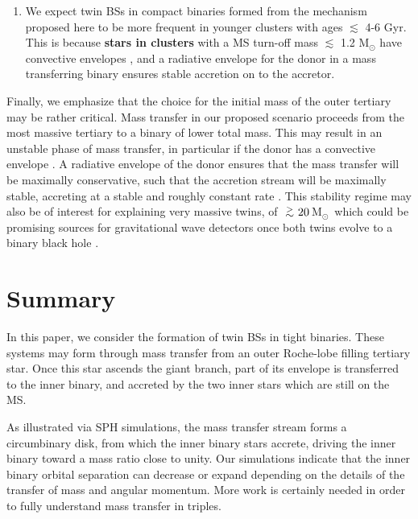 \documentclass[twocolumn]{aastex62}
\newcommand{\MSun}{\mbox{M$_\odot$}}
\def\apgt{\ {\raise-.5ex\hbox{$\buildrel>\over\sim$}}\ }
\begin{document}
\begin{enumerate}
\item We expect twin BSs in compact binaries formed from the mechanism
  proposed here to be more frequent in younger clusters with ages
  $\lesssim$ 4-6 Gyr.  This is because \textbf{stars in clusters} with a MS turn-off
  mass $\lesssim$ 1.2 M$_{\odot}$ have convective envelopes
  \citep[e.g.][]{1991ApJS...76...55I,2009pfer.book.....M}, and a
  radiative envelope for the donor in a mass transferring binary
  ensures stable accretion on to the accretor.  

\end{enumerate}

Finally, we emphasize that the choice for the initial mass of the
outer tertiary may be rather critical.  Mass transfer in our proposed
scenario proceeds from the most massive tertiary to a binary of lower
total mass. This may result in an unstable phase of mass transfer, in
particular if the donor has a convective envelope
\citep[e.g.][]{2009pfer.book.....M}. A radiative envelope of the donor
ensures that the mass transfer will be maximally conservative, such
that the accretion stream will be maximally stable, accreting at a
stable and roughly constant rate \citep[e.g.][]{1991ApJS...76...55I}.
This stability regime may also be of interest for explaining very
massive twins, of $\apgt 20$\,\MSun\, which could be promising sources
for gravitational wave detectors once both twins evolve to a binary
black hole \citep{2016MNRAS.460.3545D}.

\section{Summary} \label{sect:conclusions}

In this paper, we consider the formation of twin BSs in tight binaries.
These systems may form through mass transfer from an outer Roche-lobe
filling tertiary star. Once this star ascends the giant branch, part
of its envelope is transferred to the inner binary, and accreted by
the two inner stars which are still on the MS.

As illustrated via SPH simulations, the mass transfer stream forms a
circumbinary disk, from which the inner binary stars accrete, driving
the inner binary toward a mass ratio close to unity.  Our simulations
indicate that the inner binary orbital separation can decrease or
expand depending on the details of the transfer of mass and angular
momentum.  More work is certainly needed in order to fully understand
mass transfer in triples.
\end{document}
